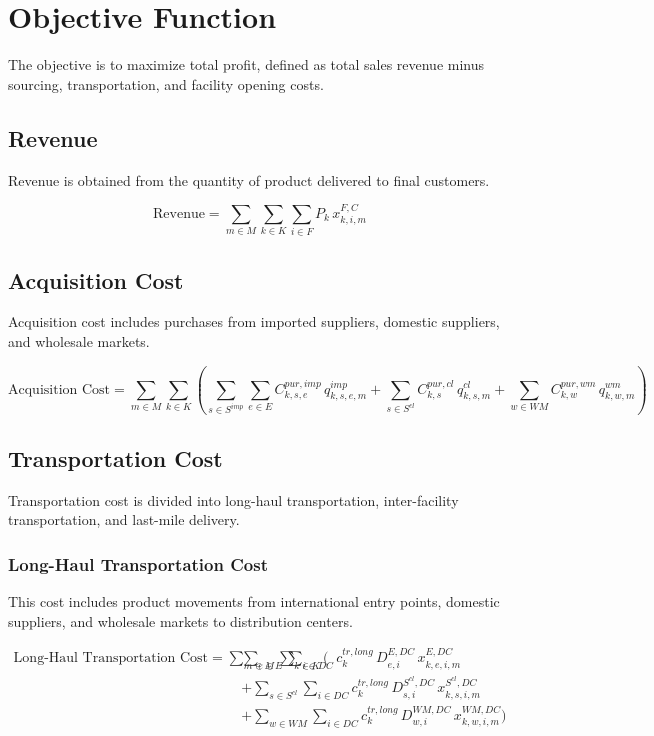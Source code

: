 \documentclass[12pt]{article}
\begin{document}
\newpage

\section{Objective Function}

The objective is to maximize total profit, defined as total sales revenue minus sourcing, transportation, and facility opening costs.

\subsection{Revenue}

Revenue is obtained from the quantity of product delivered to final customers.

\[
\text{Revenue}
=
\sum_{m \in M}\sum_{k \in K}\sum_{i \in F}
P_k \, x^{F,C}_{k,i,m}
\]

\subsection{Acquisition Cost}

Acquisition cost includes purchases from imported suppliers, domestic suppliers, and wholesale markets.

\[
\text{Acquisition Cost}
=
\sum_{m \in M}\sum_{k \in K}
\left(
\sum_{s \in S^{imp}}\sum_{e \in E}
C^{pur,imp}_{k,s,e}\, q^{imp}_{k,s,e,m}
+
\sum_{s \in S^{cl}}
C^{pur,cl}_{k,s}\, q^{cl}_{k,s,m}
+
\sum_{w \in WM}
C^{pur,wm}_{k,w}\, q^{wm}_{k,w,m}
\right)
\]

\subsection{Transportation Cost}

Transportation cost is divided into long-haul transportation, inter-facility transportation, and last-mile delivery.

\subsubsection{Long-Haul Transportation Cost}

This cost includes product movements from international entry points, domestic suppliers, and wholesale markets to distribution centers.

\begin{align*}
\text{Long-Haul Transportation Cost}
=
\sum_{m \in M} \sum_{k \in K}
\Bigg(
& \sum_{e \in E} \sum_{i \in DC}
c^{tr,long}_k \, D^{E,DC}_{e,i} \, x^{E,DC}_{k,e,i,m} \\
& + \sum_{s \in S^{cl}} \sum_{i \in DC}
c^{tr,long}_k \, D^{S^{cl},DC}_{s,i} \, x^{S^{cl},DC}_{k,s,i,m} \\
& + \sum_{w \in WM} \sum_{i \in DC}
c^{tr,long}_k \, D^{WM,DC}_{w,i} \, x^{WM,DC}_{k,w,i,m}
\Bigg)
\end{align*}
\end{document}
